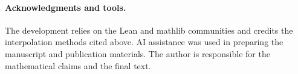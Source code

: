 \documentclass[11pt]{article}
\theoremstyle{remark}
\begin{document}
\paragraph{Acknowledgments and tools.}
The development relies on the Lean and mathlib communities and credits
the interpolation methods cited above. AI assistance was used in preparing
the manuscript and publication materials. The author is responsible for
the mathematical claims and the final text.



\end{document}
